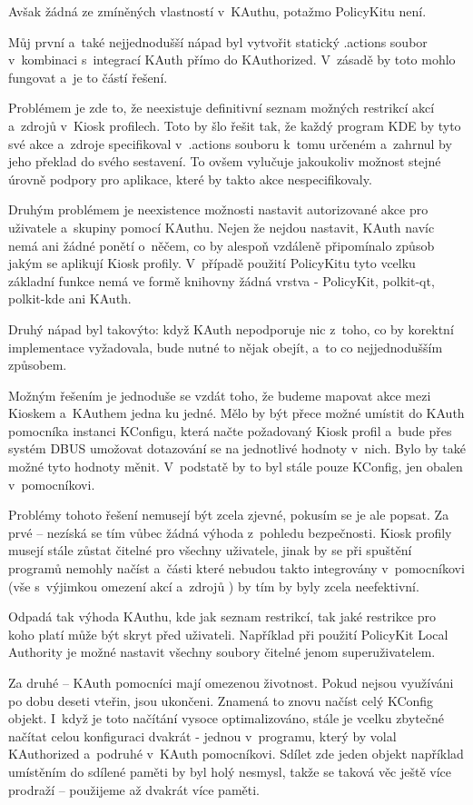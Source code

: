 Avšak žádná ze zmíněných vlastností v~KAuthu, potažmo PolicyKitu není.

Můj první a~také nejjednodušší nápad byl vytvořit statický .actions soubor
v~kombinaci s~integrací KAuth přímo do KAuthorized. V~zásadě by toto mohlo
fungovat a~je to částí řešení.

Problémem je zde to, že neexistuje definitivní seznam možných restrikcí akcí
a~zdrojů v~Kiosk profilech. Toto by šlo řešit tak, že každý program KDE by tyto
své akce a~zdroje specifikoval v~.actions souboru k~tomu určeném a~zahrnul by
jeho překlad do svého sestavení. To ovšem vylučuje jakoukoliv možnost stejné
úrovně podpory pro aplikace, které by takto akce nespecifikovaly.

Druhým problémem je neexistence možnosti nastavit autorizované akce pro
uživatele a~skupiny pomocí KAuthu. Nejen že nejdou nastavit, KAuth navíc nemá
ani žádné ponětí o~něčem, co by alespoň vzdáleně připomínalo způsob jakým
se aplikují Kiosk profily. V~případě použití PolicyKitu tyto vcelku základní
funkce nemá ve formě knihovny žádná vrstva - PolicyKit, polkit-qt, polkit-kde
ani KAuth.

Druhý nápad byl takovýto: když KAuth nepodporuje nic z~toho, co by korektní
implementace vyžadovala, bude nutné to nějak obejít, a~to co nejjednodušším
způsobem.

Možným řešením je jednoduše se vzdát toho, že budeme mapovat akce mezi
Kioskem a~KAuthem jedna ku jedné. Mělo by být přece možné umístit do KAuth
pomocníka instanci KConfigu, která načte požadovaný Kiosk profil a~bude přes
systém DBUS umožovat dotazování se na jednotlivé hodnoty v~nich. Bylo by také
možné tyto hodnoty měnit. V~podstatě by to byl stále pouze KConfig, jen obalen
v~pomocníkovi.

Problémy tohoto řešení nemusejí být zcela zjevné, pokusím se je ale popsat.
Za prvé -- nezíská se tím vůbec žádná výhoda z~pohledu bezpečnosti. Kiosk
profily musejí stále zůstat čitelné pro všechny uživatele, jinak by se
při spuštění programů nemohly načíst a~části které nebudou takto integrovány
v~pomocníkovi (vše s~výjimkou omezení akcí a~zdrojů )
by tím by byly zcela neefektivní.

Odpadá tak výhoda KAuthu, kde jak seznam restrikcí, tak jaké restrikce pro koho
platí může být skryt před uživateli. Například při použití PolicyKit Local
Authority je možné nastavit všechny soubory čitelné jenom superuživatelem.


Za druhé -- KAuth pomocníci mají omezenou životnost. Pokud nejsou využíváni po
dobu deseti vteřin, jsou ukončeni. Znamená to znovu načíst celý KConfig objekt.
I~když je toto načítání vysoce optimalizováno, stále je vcelku zbytečné načítat
celou konfiguraci dvakrát - jednou v~programu, který by volal KAuthorized
a~podruhé v~KAuth pomocníkovi. Sdílet zde jeden objekt například umístěním
do sdílené paměti by byl holý nesmysl, takže se taková věc ještě více prodraží
-- použijeme až dvakrát více paměti.


